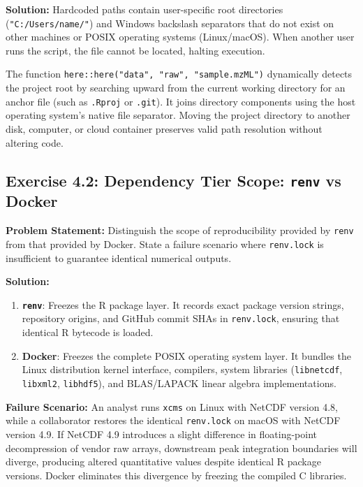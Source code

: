 \documentclass[11pt,twoside,openright]{book}
\begin{document}
\noindent\textbf{Solution:}\enspace
Hardcoded paths contain user-specific root directories (\texttt{"C:/Users/name/"}) and Windows backslash separators that do not exist on other machines or POSIX operating systems (Linux/macOS). When another user runs the script, the file cannot be located, halting execution.

The function \texttt{here::here("data", "raw", "sample.mzML")} dynamically detects the project root by searching upward from the current working directory for an anchor file (such as \texttt{.Rproj} or \texttt{.git}). It joins directory components using the host operating system's native file separator. Moving the project directory to another disk, computer, or cloud container preserves valid path resolution without altering code.

\subsection*{Exercise 4.2: Dependency Tier Scope: \texttt{renv} vs Docker}
\noindent\textbf{Problem Statement:}\enspace
Distinguish the scope of reproducibility provided by \texttt{renv} from that provided by Docker. State a failure scenario where \texttt{renv.lock} is insufficient to guarantee identical numerical outputs.

\noindent\textbf{Solution:}\enspace
\begin{enumerate}
\item \textbf{\texttt{renv}}: Freezes the R package layer. It records exact package version strings, repository origins, and GitHub commit SHAs in \texttt{renv.lock}, ensuring that identical R bytecode is loaded.
\item \textbf{Docker}: Freezes the complete POSIX operating system layer. It bundles the Linux distribution kernel interface, compilers, system libraries (\texttt{libnetcdf}, \texttt{libxml2}, \texttt{libhdf5}), and BLAS/LAPACK linear algebra implementations.
\end{enumerate}

\noindent\textbf{Failure Scenario:}\enspace
An analyst runs \texttt{xcms} on Linux with NetCDF version 4.8, while a collaborator restores the identical \texttt{renv.lock} on macOS with NetCDF version 4.9. If NetCDF 4.9 introduces a slight difference in floating-point decompression of vendor raw arrays, downstream peak integration boundaries will diverge, producing altered quantitative values despite identical R package versions. Docker eliminates this divergence by freezing the compiled C libraries.
\end{document}
